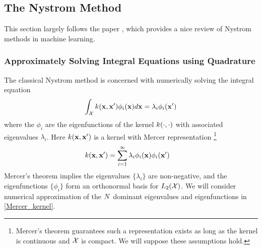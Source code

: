 \documentclass[12pt]{article}
\begin{document}
\subsection{The Nystrom Method}
This section largely follows the paper \cite{Sun}, which provides a nice review of Nystrom methods in machine learning. 

\subsubsection{Approximately Solving Integral Equations using Quadrature}
The classical Nystrom method is concerned with numerically solving the integral equation 
\begin{align}
\int_{\mathcal{X}} k(\mathbf{x}, \mathbf{x}^\prime) \phi_i(\mathbf{x}) d\mathbf{x} = \lambda_i \phi_i(\mathbf{x}^\prime) \label{integral_eqn}
\end{align}
where the $\phi_i$ are the eigenfunctions of the kernel $k(\cdot, \cdot)$ with associated eigenvalues $\lambda_i$. Here $k(\mathbf{x}, \mathbf{x}^\prime)$ is a kernel with 
Mercer representation \footnote{Mercer's theorem guarantees such a representation exists as long as the kernel is continuous and $\mathcal{X}$ is compact. We will suppose these assumptions hold.} 
\begin{align}
k(\mathbf{x}, \mathbf{x}^\prime) &= \sum_{i = 1}^{\infty} \lambda_i \phi_i(\mathbf{x}) \phi_i(\mathbf{x}^\prime) \label{Mercer_kernel}
\end{align}
Mercer's theorem implies the eigenvalues $\{\lambda_i\}$ are non-negative, and the eigenfunctions $\{\phi_i\}$ form an orthonormal basis for $L_2(\mathcal{X})$. We will consider numerical 
approximation of the $N$ dominant eigenvalues and eigenfunctions in \ref{Mercer_kernel}.
\end{document}

